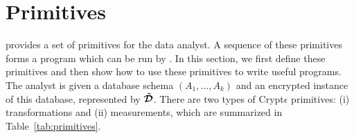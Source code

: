
\section{\system Primitives}\label{sec:primitives}
\system provides a set of \system primitives for the data analyst.
A sequence of these primitives forms a program which can be run by \system.
In this section, we first define these primitives and then show how to use these primitives to write useful programs.
The analyst is given a database schema $(A_1,\ldots,A_k)$ and an encrypted instance of this database, represented by $\boldsymbol{\tilde{\mathcal{D}}}$.
There are two types of Crypt$\epsilon$ primitives:  (i) transformations and (ii) measurements, which are summarized in Table~\ref{tab:primitives}.




